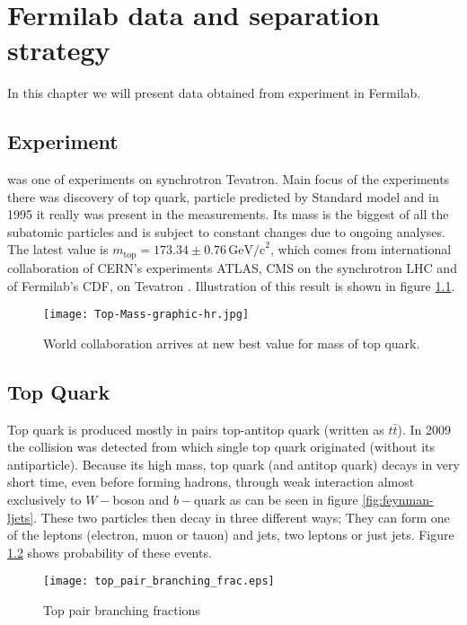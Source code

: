 \chapter{Fermilab data and separation strategy}

In this chapter we will present data obtained from experiment \dzero in Fermilab. 

\section{\texorpdfstring{\dzero}{D0} Experiment}
\dzero was one of experiments on synchrotron Tevatron. Main focus of the experiments there was discovery of top quark, particle predicted by Standard model and in 1995 it really was present in the measurements. Its mass is the biggest of all the subatomic particles and is subject to constant changes due to ongoing analyses. The latest value is $m_\mathrm{top} = 173.34 \pm 0.76 \,\mathrm{GeV/c}^2 $, which comes from international collaboration of CERN's experiments ATLAS, CMS on the synchrotron LHC and of Fermilab's CDF, \dzero on Tevatron \cite{jointMass}. Illustration of this result is shown in figure \ref{fig:jointMass}.

\begin{figure}[htb]
	\centering
	\texttt{[image: Top-Mass-graphic-hr.jpg]}
	\caption{World collaboration arrives at new best value for mass of top quark.}
	\label{fig:jointMass}
\end{figure}

\section{Top Quark}
Top quark is produced mostly in pairs top-antitop quark (written as $t\bar{t}$). In 2009 the collision was detected from which single top quark originated  (without its antiparticle). Because its high mass, top quark (and antitop quark) decays in very short time, even before forming hadrons, through weak interaction almost exclusively to $W-$boson and $b-$quark as can be seen in figure \ref{fig:feynman-ljets}. These two particles then decay in three different ways; They can form one of the leptons (electron, muon or tauon) and jets, two leptons or just jets. Figure \ref{fig:ttbarBranchingFrac} shows probability of these events. 

\begin{figure}[htb]
	\centering
	\texttt{[image: top\_pair\_branching\_frac.eps]}
	\caption{Top pair branching fractions}
	\label{fig:ttbarBranchingFrac}
\end{figure}

